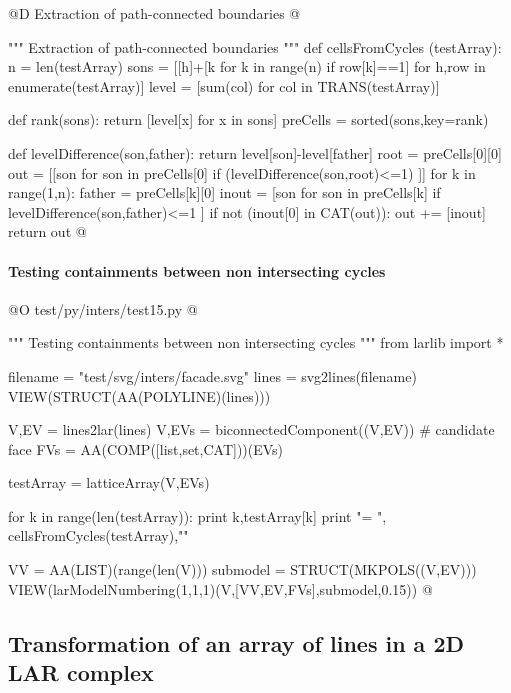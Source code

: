 \documentclass[11pt,oneside]{article}    %
\begin{document}
@D Extraction of path-connected boundaries
@{""" Extraction of path-connected boundaries """
def cellsFromCycles (testArray):
    n = len(testArray)
    sons = [[h]+[k for k in range(n) if row[k]==1] for h,row in enumerate(testArray)]
    level = [sum(col) for col in TRANS(testArray)]
    
    def rank(sons): return [level[x] for x in sons]
    preCells = sorted(sons,key=rank)

    def levelDifference(son,father): return level[son]-level[father]
    root = preCells[0][0]
    out = [[son for son in preCells[0] if (levelDifference(son,root)<=1) ]]
    for k in range(1,n):
        father = preCells[k][0]
        inout = [son for son in preCells[k] if levelDifference(son,father)<=1 ]
        if not (inout[0] in CAT(out)):
            out += [inout]
    return out        
@}

\paragraph{Testing containments between non intersecting cycles}

@O test/py/inters/test15.py
@{""" Testing containments between non intersecting cycles """
from larlib import *

filename = "test/svg/inters/facade.svg"
lines = svg2lines(filename)
VIEW(STRUCT(AA(POLYLINE)(lines)))

V,EV = lines2lar(lines)
V,EVs = biconnectedComponent((V,EV))
# candidate face
FVs = AA(COMP([list,set,CAT]))(EVs)

testArray = latticeArray(V,EVs)

for k in range(len(testArray)):
	print k,testArray[k]
print "\ncells = ", cellsFromCycles(testArray),"\n"

VV = AA(LIST)(range(len(V)))
submodel = STRUCT(MKPOLS((V,EV)))
VIEW(larModelNumbering(1,1,1)(V,[VV,EV,FVs],submodel,0.15)) 
@}


\subsection{Transformation of an array of lines in a 2D LAR complex}
\end{document}
